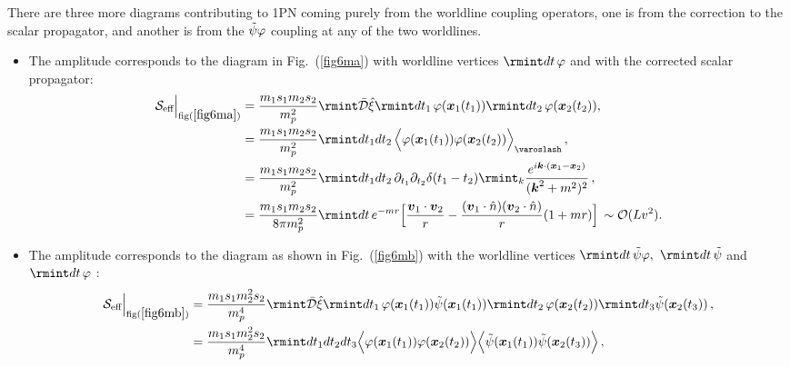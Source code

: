 There are three more diagrams contributing to 1PN coming purely from the worldline coupling operators, one is from the correction to the scalar propagator, and another is from the $\Tilde{\psi}\varphi$ coupling at any of the two worldlines. 
\begin{itemize}
\item The amplitude corresponds to the diagram in Fig.~(\ref{fig6ma}) with worldline vertices $\rmint dt\,\varphi$ and with the corrected scalar propagator:
\begin{align}
\begin{split}
    \mathcal{S}_{\text{eff}}\Big|_{\text{fig}(\ref{fig6ma})}&=\frac{m_1s_1m_2s_2}{m_{p}^2}\rmint\Bar{\mathcal{D}}\Hat{\xi}\rmint dt_1 \,\varphi(\boldsymbol{x}_1(t_1)) \rmint dt_2 \,\varphi(\boldsymbol{x}_2(t_2)),\\ &
    =\frac{m_1s_1m_2s_2}{m_p^2}\rmint dt_1 dt_2\,\Big\langle\varphi(\boldsymbol{x}_1(t_1))\varphi(\boldsymbol{x}_2(t_2))\Big\rangle_{\varoslash}\,,\\ &
    =\frac{m_1s_1m_2s_2}{m_p^2}\rmint dt_1 dt_2\, \partial_{t_1}\partial_{t_2}\delta(t_1-t_2)\rmint_{k}\frac{e^{i\boldsymbol{k}\cdot(\boldsymbol{x}_1-\boldsymbol{x}_{2})}}{(\boldsymbol{k}^2+m^2)^2}\,,\\ &
    =\frac{m_1s_1m_2s_2}{8\pi m_p^2}\rmint dt \,e^{-mr}\Big[\frac{\boldsymbol{v}_1\cdot\boldsymbol{v}_2}{r}-\frac{(\boldsymbol{v}_1\cdot\Hat{n})(\boldsymbol{v}_2\cdot\Hat{n})}{r}(1+mr)\Big]\,\sim \mathcal{O}(Lv^2).
    \end{split}
\end{align}
\item The amplitude corresponds to the diagram as shown in Fig.~(\ref{fig6mb}) with the worldline vertices $\rmint dt \,\Tilde{\psi}\varphi,$  $\rmint dt \,\Tilde{\psi}$ and  $\rmint dt \,\varphi$ : 
\begin{align}
    \begin{split}
        \mathcal{S}_{\text{eff}}\Big |_{\text{fig}(\ref{fig6mb})}&=\frac{m_1s_1m_2^2s_2}{m_{p}^4}\rmint\Bar{\mathcal{D}}\Hat{\xi}\rmint dt_1 \,\varphi(\boldsymbol{x}_1(t_1))\Tilde{\psi}(\boldsymbol{x}_1(t_1)) \rmint dt_2 \,\varphi(\boldsymbol{x}_2(t_2))\rmint dt_3 \Tilde{\psi}(\boldsymbol{x}_2(t_3)) \,,\\ &=\frac{m_1 s_1 m_2^2s_2}{m_p^4}\rmint dt_1 dt_2 dt_3 \Big\langle\varphi(\boldsymbol{x}_1(t_1))\varphi(\boldsymbol{x}_2(t_2))\Big\rangle \Big\langle\Tilde{\psi}(\boldsymbol{x}_1(t_1))\Tilde{\psi}(\boldsymbol{x}_2(t_3))\Big\rangle\,,\\ &

\end{split}
\end{align}
\end{itemize}
